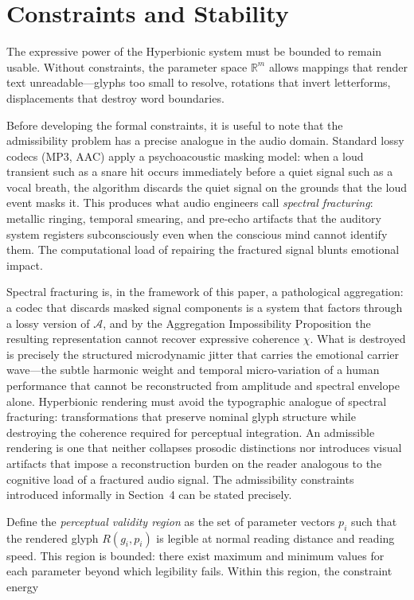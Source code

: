 \documentclass[12pt, a4paper]{article}
\begin{document}
\section{Constraints and Stability}

The expressive power of the Hyperbionic system must be bounded to remain usable. Without constraints, the parameter space $\mathbb{R}^m$ allows mappings that render text unreadable---glyphs too small to resolve, rotations that invert letterforms, displacements that destroy word boundaries.

Before developing the formal constraints, it is useful to note that the admissibility problem has a precise analogue in the audio domain. Standard lossy codecs (MP3, AAC) apply a psychoacoustic masking model: when a loud transient such as a snare hit occurs immediately before a quiet signal such as a vocal breath, the algorithm discards the quiet signal on the grounds that the loud event masks it. This produces what audio engineers call \emph{spectral fracturing}: metallic ringing, temporal smearing, and pre-echo artifacts that the auditory system registers subconsciously even when the conscious mind cannot identify them. The computational load of repairing the fractured signal blunts emotional impact.

Spectral fracturing is, in the framework of this paper, a pathological aggregation: a codec that discards masked signal components is a system that factors through a lossy version of $\mathcal{A}$, and by the Aggregation Impossibility Proposition the resulting representation cannot recover expressive coherence $\chi$. What is destroyed is precisely the structured microdynamic jitter that carries the emotional carrier wave---the subtle harmonic weight and temporal micro-variation of a human performance that cannot be reconstructed from amplitude and spectral envelope alone. Hyperbionic rendering must avoid the typographic analogue of spectral fracturing: transformations that preserve nominal glyph structure while destroying the coherence required for perceptual integration. An admissible rendering is one that neither collapses prosodic distinctions nor introduces visual artifacts that impose a reconstruction burden on the reader analogous to the cognitive load of a fractured audio signal. The admissibility constraints introduced informally in Section~4 can be stated precisely.

Define the \emph{perceptual validity region} as the set of parameter vectors $p_i$ such that the rendered glyph $R(g_i, p_i)$ is legible at normal reading distance and reading speed. This region is bounded: there exist maximum and minimum values for each parameter beyond which legibility fails. Within this region, the constraint energy
\end{document}

